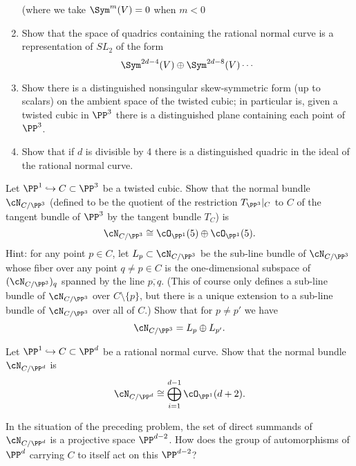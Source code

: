 \begin{exercise}
\begin{enumerate}
  (where we take $\Sym^{m}(V)=0$ when $m<0$
 \item Show that the space of quadrics containing the rational normal curve is a representation of $SL_2$ of the form
 $$
 \Sym^{2d-4}(V)\oplus \Sym^{2d-8}(V) \cdots
 $$
  \item Show  there is a distinguished nonsingular skew-symmetric form (up to scalars) on the ambient space of the twisted cubic; in particular
  is, given a twisted cubic in $\PP^3$ there is a distinguished plane containing each point of $\PP^3$.
 \item Show that if $d$ is divisible by 4 there is a distinguished quadric in the ideal of the rational normal curve.
\end{enumerate}
\end{exercise}

\begin{exercise}
Let $\PP^1 \hookrightarrow C \subset \PP^3$ be a twisted cubic. Show that the normal bundle $\cN_{C/\PP^3}$ (defined to be the quotient of the restriction $T_{\PP^3}|_C$ to $C$ of the tangent bundle  of $\PP^3$  by the tangent bundle $T_C$) is 
$$
\cN_{C/\PP^3} \cong \cO_{\PP^1}(5) \oplus  \cO_{\PP^1}(5).
$$
Hint: for any point $p \in C$, let $L_p \subset \cN_{C/\PP^3}$ be the sub-line bundle of $\cN_{C/\PP^3}$ whose fiber over any point $q \neq p \in C$ is the one-dimensional subspace of $(\cN_{C/\PP^3})_q$ spanned by the line $\overline{p,q}$. (This of course only defines a sub-line bundle of $\cN_{C/\PP^3}$ over $C \setminus \{p\}$, but there is a unique extension to a sub-line bundle of $\cN_{C/\PP^3}$ over all of $C$.) Show that for $p \neq p'$ we have
$$
\cN_{C/\PP^3} = L_p \oplus L_{p'}.
$$
\end{exercise}

\begin{exercise}
Let $\PP^1 \hookrightarrow C \subset \PP^d$ be a rational normal curve. Show that the normal bundle $\cN_{C/\PP^d}$  is 
$$
\cN_{C/\PP^d} \cong \bigoplus_{i=1}^{d-1} \cO_{\PP^1}(d+2).
$$
\end{exercise}

\begin{exercise}
In the situation of the preceding problem, the set  of direct summands of $\cN_{C/\PP^d} $ is a projective space $\PP^{d-2}$. How does the  group of automorphisms of $\PP^d$ carrying $C$ to itself act on this $\PP^{d-2}$?

\end{exercise}

